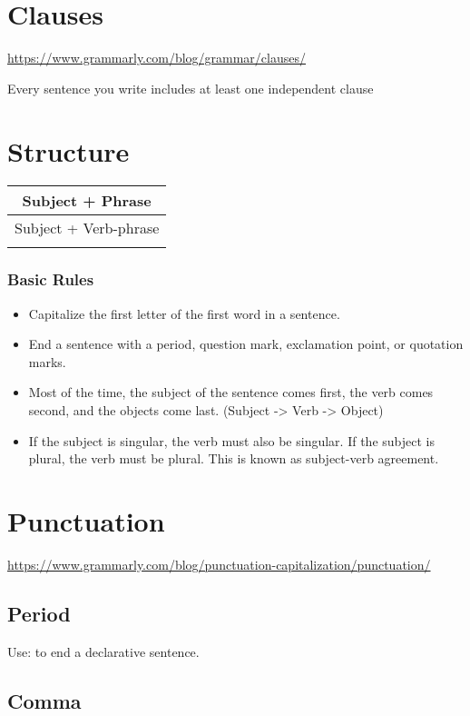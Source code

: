 \documentclass{book}
\begin{document}
\chapter{Clauses}
\url{https://www.grammarly.com/blog/grammar/clauses/}

Every sentence you write includes at least one independent clause

\chapter{Structure}
\begin{tabular}{c}
	\toprule
	Subject + Phrase      \\
	\midrule
	Subject + Verb-phrase \\
	\\
	\bottomrule
\end{tabular}

\subsection{Basic Rules}
\begin{itemize}
	\item Capitalize the first letter of the first word in a sentence.
	\item End a sentence with a period, question mark, exclamation point, or quotation marks.
	\item Most of the time, the subject of the sentence comes first, the verb comes second, and the objects come last. (Subject -> Verb -> Object)
	\item If the subject is singular, the verb must also be singular. If the subject is plural, the verb must be plural. This is known as subject-verb agreement.
\end{itemize}

\chapter{Punctuation}
\url{https://www.grammarly.com/blog/punctuation-capitalization/punctuation/}

\section{Period}
Use: to end a declarative sentence.

\section{Comma}
\end{document}

